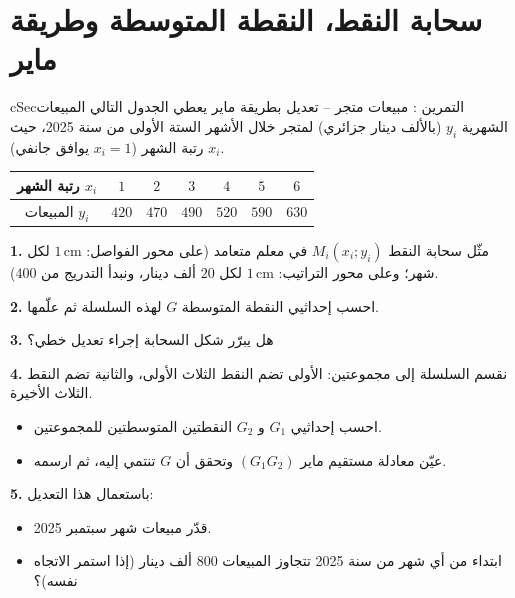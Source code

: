\documentclass[12pt,a4paper]{article}
\newenvironment{BOX}[2]{\begin{otherlanguage}{english}\begin{arbox}{#1}{#2}}{\end{arbox}\end{otherlanguage}}
\newcounter{exo}
\newenvironment{tamrin}[1]{\stepcounter{exo}\begin{BOX}{cSec}{التمرين \theexo: #1}}{\end{BOX}}
\newenvironment{LTR}{\begin{otherlanguage}{english}}{\end{otherlanguage}}
\newcommand{\ar}[1]{\foreignlanguage{arabic}{#1}}
\newenvironment{sq}{\begin{itemize}[leftmargin=2.4em,itemsep=3pt]}{\end{itemize}}
\newcommand{\qa}{\item[(أ)]}\newcommand{\qb}{\item[(ب)]}\newcommand{\qc}{\item[(جـ)]}\newcommand{\qd}{\item[(د)]}\newcommand{\qe}{\item[(هـ)]}
\newcommand{\QQ}[1]{\par\smallskip\textbf{#1.} }
\begin{document}
\section{سحابة النقط، النقطة المتوسطة وطريقة ماير}
\begin{tamrin}{مبيعات متجر -- تعديل بطريقة ماير}
يعطي الجدول التالي المبيعات الشهرية $y_i$ (بالألف دينار جزائري) لمتجر خلال الأشهر الستة الأولى من سنة 2025، حيث $x_i$ رتبة الشهر ($x_i=1$ يوافق جانفي).
\begin{center}\begin{LTR}\renewcommand{\arraystretch}{1.35}\small
\begin{tabular}{|c|c|c|c|c|c|c|}\hline
\rowcolor{cSec!12}\ar{رتبة الشهر} $x_i$ & $1$ & $2$ & $3$ & $4$ & $5$ & $6$\\\hline
\ar{المبيعات} $y_i$ & $420$ & $470$ & $490$ & $520$ & $590$ & $630$\\\hline
\end{tabular}\end{LTR}\end{center}
\QQ{1} مثّل سحابة النقط $M_i(x_i;y_i)$ في معلم متعامد (على محور الفواصل: $1\,\text{cm}$ لكل شهر؛ وعلى محور التراتيب: $1\,\text{cm}$ لكل $20$ ألف دينار، ونبدأ التدريج من $400$).
\QQ{2} احسب إحداثيي النقطة المتوسطة $G$ لهذه السلسلة ثم علّمها.
\QQ{3} هل يبرّر شكل السحابة إجراء تعديل خطي؟
\QQ{4} نقسم السلسلة إلى مجموعتين: الأولى تضم النقط الثلاث الأولى، والثانية تضم النقط الثلاث الأخيرة.
\begin{sq}
\qa احسب إحداثيي $G_1$ و $G_2$ النقطتين المتوسطتين للمجموعتين.
\qb عيّن معادلة مستقيم ماير $(G_1G_2)$ وتحقق أن $G$ تنتمي إليه، ثم ارسمه.
\end{sq}
\QQ{5} باستعمال هذا التعديل:
\begin{sq}
\qa قدّر مبيعات شهر سبتمبر 2025.
\qb ابتداء من أي شهر من سنة 2025 تتجاوز المبيعات $800$ ألف دينار (إذا استمر الاتجاه نفسه)؟
\end{sq}
\end{tamrin}
\end{document}
